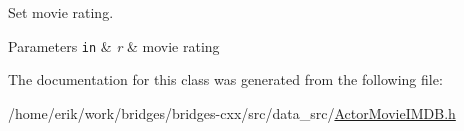 Set movie rating. 


\begin{DoxyParams}[1]{Parameters}
\mbox{\tt in}  & {\em r} & movie rating \\
\hline
\end{DoxyParams}


The documentation for this class was generated from the following file\+:\begin{DoxyCompactItemize}
\item 
/home/erik/work/bridges/bridges-\/cxx/src/data\+\_\+src/\hyperlink{_actor_movie_i_m_d_b_8h}{Actor\+Movie\+I\+M\+D\+B.\+h}\end{DoxyCompactItemize}
